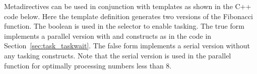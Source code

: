 




Metadirectives can be used in conjunction with templates as shown in the C++ code below.
Here the template definition generates two versions of the Fibonacci function.
The  boolean is used in the  selector to enable tasking.
The true form implements a parallel version with  and 
constructs as in the  code in Section~\ref{sec:task_taskwait}. 
The false form implements a serial version without any tasking constructs.
Note that the serial version is used in the parallel function for optimally
processing numbers less than 8.


